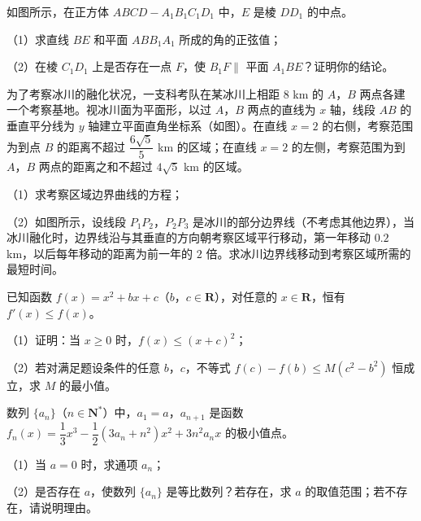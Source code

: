 \endgroup
\begingroup
\renewenvironment{question}{\Needspace{0.5\textheight}}{}
\begin{question}
如图所示，在正方体 $ABCD-A_1B_1C_1D_1$ 中，$E$ 是棱 $DD_1$ 的中点。

（1）求直线 $BE$ 和平面 $ABB_1A_1$ 所成的角的正弦值；

（2）在棱 $C_1D_1$ 上是否存在一点 $F$，使 $B_1F\parallel$ 平面 $A_1BE$？证明你的结论。
\nopagebreak[4]
\begin{center}\end{center}
\nopagebreak[4]
\Needspace{0.4\textheight}
\end{question}
\endgroup
\begingroup
\renewenvironment{question}{\Needspace{0.5\textheight}}{}
\begin{question}
为了考察冰川的融化状况，一支科考队在某冰川上相距 $8$ km 的 $A$，$B$ 两点各建一个考察基地。视冰川面为平面形，以过 $A$，$B$ 两点的直线为 $x$ 轴，线段 $AB$ 的垂直平分线为 $y$ 轴建立平面直角坐标系（如图）。在直线 $x=2$ 的右侧，考察范围为到点 $B$ 的距离不超过 $\dfrac{6\sqrt5}{5}$ km 的区域；在直线 $x=2$ 的左侧，考察范围为到 $A$，$B$ 两点的距离之和不超过 $4\sqrt5$ km 的区域。

（1）求考察区域边界曲线的方程；

（2）如图所示，设线段 $P_1P_2$，$P_2P_3$ 是冰川的部分边界线（不考虑其他边界），当冰川融化时，边界线沿与其垂直的方向朝考察区域平行移动，第一年移动 $0.2$ km，以后每年移动的距离为前一年的 $2$ 倍。求冰川边界线移动到考察区域所需的最短时间。
\nopagebreak[4]
\begin{center}\end{center}
\nopagebreak[4]
\end{question}
\endgroup
\begin{question}
已知函数 $f(x)=x^2+bx+c$（$b$，$c\in\mathbf R$），对任意的 $x\in\mathbf R$，恒有 $f'(x)\leqslant f(x)$。

（1）证明：当 $x\geqslant0$ 时，$f(x)\leqslant(x+c)^2$；

（2）若对满足题设条件的任意 $b$，$c$，不等式 $f(c)-f(b)\leqslant M(c^2-b^2)$ 恒成立，求 $M$ 的最小值。

\end{question}
\begin{question}
数列 $\{a_n\}$（$n\in\mathbf N^*$）中，$a_1=a$，$a_{n+1}$ 是函数 $f_n(x)=\dfrac13x^3-\dfrac12(3a_n+n^2)x^2+3n^2a_nx$ 的极小值点。

（1）当 $a=0$ 时，求通项 $a_n$；

（2）是否存在 $a$，使数列 $\{a_n\}$ 是等比数列？若存在，求 $a$ 的取值范围；若不存在，请说明理由。

\end{question}